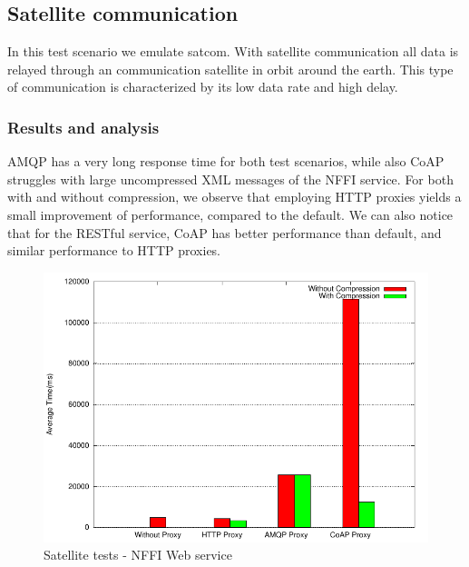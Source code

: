 \subsection{Satellite communication}

In this test scenario we emulate \gls{satcom}. With satellite communication
all data is relayed through an communication satellite in orbit around
the earth. This type of communication is characterized by its low data rate
and high delay.

\subsubsection{Results and analysis}

AMQP has a very long response time for both test scenarios, while also CoAP
struggles with large uncompressed XML messages of the NFFI service. For both
with and without compression, we observe that employing HTTP proxies yields a
small improvement of performance, compared to the default. We can also notice
that for the RESTful service, CoAP has better performance than default, and
similar performance to HTTP proxies.

\begin{figure}[H]
\center
\includegraphics[scale=0.75]{../results/satellite/nffi/result.pdf}
\caption{Satellite tests - NFFI Web service}
\end{figure}

